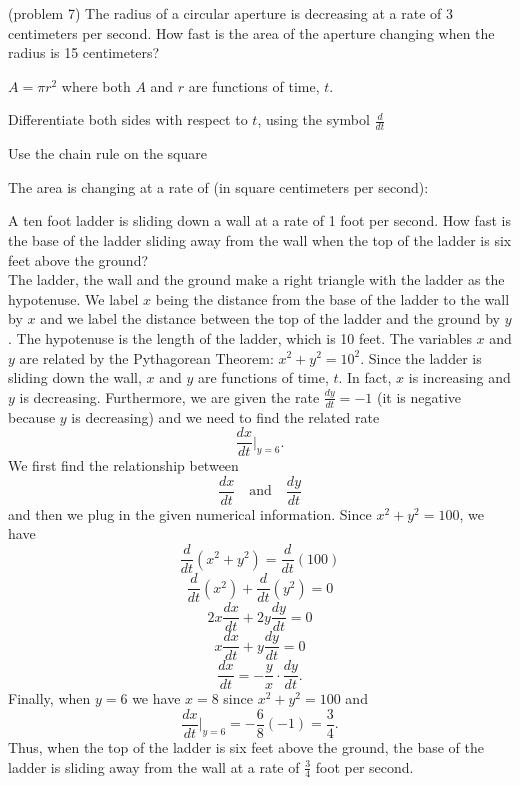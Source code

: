 \documentclass[handout]{ximera}
\begin{document}
\begin{problem}(problem 7)
The radius of a circular aperture is decreasing at a rate of 3 centimeters per second.  
How fast is the area of the aperture changing when the radius is 15 centimeters?

\begin{hint}
$A = \pi r^2$ where both $A$ and $r$ are functions of time, $t$.
\end{hint}

\begin{hint}
Differentiate both sides with respect to $t$, using the symbol $\frac{d}{dt}$
\end{hint}
\begin{hint}
Use the chain rule on the square
\end{hint}

The area is changing at a rate of (in square centimeters per second):
\begin{multipleChoice}
\choice{$90 \pi$}
\choice[correct]{$-90 \pi$}
\choice{$-120 \pi$}
\end{multipleChoice}
\end{problem}


\begin{example}[example 8]
A ten foot ladder is sliding down a wall at a rate of 1 foot per second.  How fast is the base of the 
ladder sliding away from the wall when the top of the ladder is six feet above the ground?\\
 The ladder, the wall and the ground make a right triangle with the ladder as the hypotenuse.  
We label $x$ being the distance from the base of the ladder 
to the wall by $x$ and we label  the distance between the top of the ladder and the ground by $y$. 
The hypotenuse is the length of the
ladder, which is 10 feet. The variables $x$ and $y$ are related by the 
Pythagorean Theorem: $x^2 + y^2 = 10^2$. Since the ladder is
sliding down the wall, $x$ and $y$ are functions of time, $t$. 
In fact, $x$ is increasing and $y$ is decreasing. Furthermore, we are given 
the rate $\frac{dy}{dt} = -1$ (it is negative because $y$ is decreasing)
and we need to find the related rate
\[\frac{dx}{dt}\bigg|_{y = 6}.\]
We first find the relationship between 
\[\frac{dx}{dt} \quad \text{and} \quad \frac{dy}{dt}\]
and then we plug in the given numerical information.
Since $x^2 + y^2 = 100$, we have
\[\frac{d}{dt} (x^2 + y^2 ) = \frac{d}{dt}(100)\]
\[\frac{d}{dt} (x^2) +\frac{d}{dt}(y^2 ) = 0\]
\[2x\frac{dx}{dt} + 2y\frac{dy}{dt} = 0\]
\[x\frac{dx}{dt} + y\frac{dy}{dt} = 0\]
\[\frac{dx}{dt} =- \frac{y}{x}\cdot \frac{dy}{dt}. \]
Finally, when $y= 6$ we have $x=8$ since $x^2 + y^2 = 100$ and
\[\frac{dx}{dt}\bigg|_{y = 6}= -\frac68 (-1) = \frac34.\]
Thus, when the top of the ladder is six feet above the ground, 
the base of the ladder is sliding away from the wall 
at a rate of $\frac34$ foot per second.

\begin{center}
\end{center}






\end{example}
\end{document}
